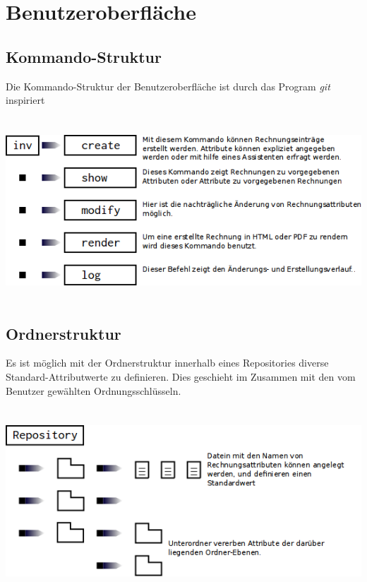 
\section{Benutzeroberfläche}

\subsection{Kommando-Struktur}
Die Kommando-Struktur der Benutzeroberfläche ist durch das Program \emph{git} inspiriert\\
\\\\
\includegraphics[width=\textwidth]{kommando-struktur.png}
\\
\\
\subsection{Ordnerstruktur}
Es ist möglich mit der Ordnerstruktur innerhalb eines Repositories diverse
Standard-Attributwerte zu definieren. Dies geschieht im Zusammen mit den vom
Benutzer gewählten Ordnungsschlüsseln.\\
\\\\
\includegraphics[width=\textwidth]{ordnerstruktur-struktur.png}



